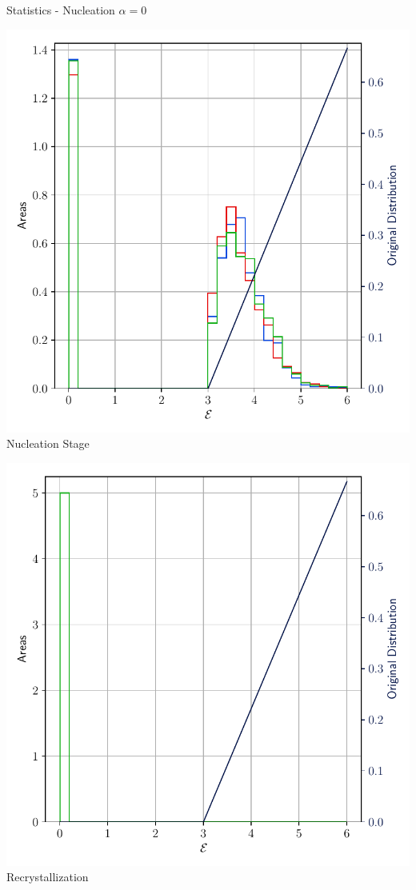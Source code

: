 \documentclass[usenames,dvipsnames]{beamer}
\begin{document}
\begin{frame}{Statistics - Nucleation $\alpha = 0$}
\small
    \begin{minipage}{0.5\textwidth}
    \centering
    \includegraphics[scale=0.4]{figures/stored_energy/SE/se/000110_nuclconstant_set.pdf}\\
    Nucleation Stage
    \end{minipage}%
    \begin{minipage}{0.5\textwidth}
    \centering
    \includegraphics[scale=0.4]{figures/stored_energy/SE/se/000240_nuclconstant_set.pdf}\\
    Recrystallization
    \end{minipage}
\end{frame}
\end{document}
